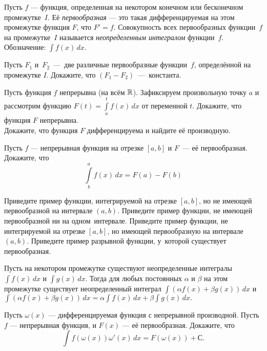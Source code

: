 \documentclass[a4paper,12pt]{article}
\begin{document}
\sloppy
{}


 Пусть $f$ --- функция, определенная на некотором конечном или бесконечном
промежутке~$I$.
Её {\em первообразная} --- это такая дифференцируемая на этом
промежутке функция $F$, что $F'=f$.
Совокупность всех первообразных функции~$f$ на промежутке~$I$ называется {\it неопределенным интегралом} функции~$f$. Обозначение: $\int f(x)\,dx$.

Пусть $F_1$ и~$F_2$~---~две различные первообразные функции~$f$, определённой на промежутке $I$.
Докажите, что $(F_1-F_2)$~---~константа.


 Пусть функция $f$ непрерывна (на всём $\mathbb{R}$).
Зафиксируем произвольную точку $a$ и рассмотрим функцию $F(t) = \int\limits_a^tf(x)\, dx$ от
переменной $t$.  Докажите, что функция $F$ непрерывна.
\\ Докажите, что функция $F$ дифференцируема и найдите её производную.


Пусть $f$ --- непрерывная функция на отрезке $[a,b]$ и $F$~--- её первообразная.
Докажите, что
\vspace*{-4mm}
$$\int\limits_b^af(x)\, dx=F(a)-F(b)$$
\vspace*{-5mm}


Приведите пример функции, интегрируемой на отрезке $[a,b]$, но не имеющей первообразной на интервале $(a,b)$.
Приведите пример функции, не имеющей первообразной ни на одном~интервале.
Приведите пример функции, не интегрируемой на отрезке $[a,b]$, но имеющей первообразную на интервале $(a,b)$.
Приведите пример разрывной функции, у~которой существует первообразная.

 Пусть на некотором промежутке существуют неопределенные
интегралы $\int f(x)\,dx$ и $\int g(x)\,dx$.
Тогда для любых постоянных $\alpha$ и $\beta$ на этом промежутке существует
неопределенный интеграл $\int (\alpha f(x)+\beta g(x))\,dx$ и $ \int
(\alpha f(x) + \beta g(x))\,dx = \alpha \int f(x)\,dx + \beta \int
g(x)\,dx. $


Пусть $\omega (x)$ --- дифференцируемая функция с непрерывной производной.
Пусть $f$ --- непрерывная функция, и $F(x)$ --- её первообразная.
Докажите, что
\vspace*{-3mm}
$$\int f(\omega (x))\omega '(x)\, dx=F(\omega (x)) + С.$$
\vspace*{-5mm}
\end{document}

